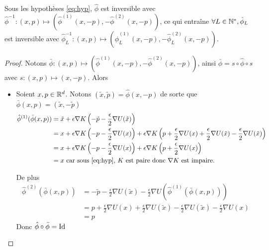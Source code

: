 \documentclass[10pt,a4paper]{article}
\begin{document}
\begin{Prop}[réversibilité]\label{prop:rev-leapfrog}
  Sous les hypothèses \eqref{eq:hyp}, $\hat{\phi}$ est inversible avec $\hat{\phi}^{-1} : (x,p) \mapsto (\hat{\phi}^{(1)}(x,-p), -\hat{\phi}^{(2)}(x,-p))$, ce qui entraîne $\forall L \in \mathbb{N}^*, \hat{\phi}_L$ est inversible avec $\hat{\phi}_L^{-1} : (x,p) \mapsto (\hat{\phi}_L^{(1)}(x,-p), -\hat{\phi}_L^{(2)}(x,-p))$. 
\end{Prop}
\begin{proof}
	Notons $\bar{\phi} : (x,p) \mapsto (\hat{\phi}^{(1)}(x,-p), -\hat{\phi}^{(2)}(x,-p))$, ainsi $\bar \phi = s \circ \hat \phi \circ s$ avec $s : (x, p) \mapsto (x,-p)$. Alors
	\begin{itemize}
		\item Soient $x,p \in \mathbb{R}^d$. Notons $(\tilde x, \tilde p) = \hat \phi(x,-p)$ de sorte que $\bar \phi(x,p) = (\tilde x, - \tilde p)$
		\begin{align*}
			\hat{\phi}^{(1)} (\bar{\phi}(x,p))
			&= \tilde x + \epsilon \nabla K \left( -\tilde p - \frac{\epsilon}{2} \nabla U (\tilde x) \right) \\
			&= x + \epsilon \nabla K \left(-p - \frac{\epsilon}{2} \nabla U(x) \right) + \epsilon \nabla K \left(p + \frac{\epsilon}{2} \nabla U(x) + \frac{\epsilon}{2} \nabla U(\tilde x) - \frac{\epsilon}{2} \nabla U (\tilde x) \right) \\
			&= x + \epsilon \nabla K \left(-p - \frac{\epsilon}{2} \nabla U(x) \right) + \epsilon \nabla K \left(p + \frac{\epsilon}{2} \nabla U(x)\right) \\
			&= x \text{ car sous \eqref{eq:hyp}, } K \text{ est paire donc } \nabla K \text{ est impaire.}
		\end{align*}

		De plus
		\begin{align*}
			\hat{\phi}^{(2)}(\bar{\phi}(x,p))
			&= -\tilde p - \frac{\epsilon}{2} \nabla U(\tilde x) - \frac{\epsilon}{2} \nabla U(\hat{\phi}^{(1)}(\bar{\phi}(x,p))) \\
			&= p + \frac{\epsilon}{2} \nabla U(x) + \frac{\epsilon}{2} \nabla U(\tilde x) - \frac{\epsilon}{2} \nabla U(\tilde x) - \frac{\epsilon}{2} \nabla U(x) \\
			&= p
		\end{align*}
		Donc $\hat{\phi} \circ \bar{\phi} = \operatorname{Id}$


\end{itemize}
\end{proof}
\end{document}
